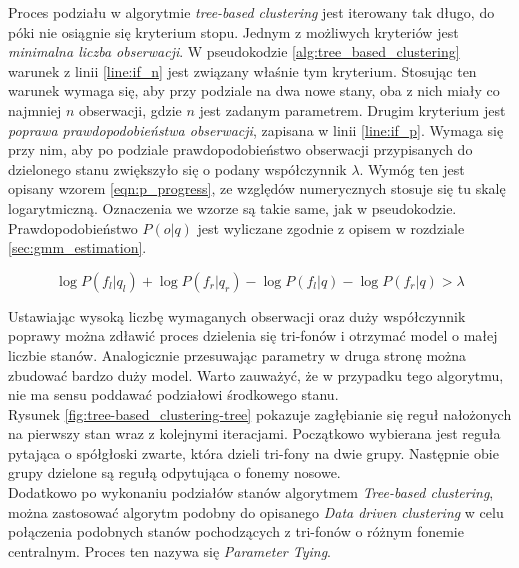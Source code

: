 \documentclass[shortabstract, mgr]{iithesis}
\begin{document}
	Proces podziału w algorytmie \textit{tree-based clustering} jest iterowany tak długo, do póki nie osiągnie się kryterium stopu. Jednym z możliwych kryteriów jest \textit{minimalna liczba obserwacji}. W pseudokodzie \ref{alg:tree_based_clustering} warunek z linii \ref{line:if_n} jest związany właśnie tym kryterium. Stosując ten warunek wymaga się, aby przy podziale na dwa nowe stany, oba z nich miały co najmniej $n$ obserwacji, gdzie $n$ jest zadanym parametrem. Drugim kryterium jest \textit{poprawa prawdopodobieństwa obserwacji}, zapisana w linii \ref{line:if_p}. Wymaga się przy nim, aby po podziale prawdopodobieństwo obserwacji przypisanych do dzielonego stanu zwiększyło się o podany współczynnik $\lambda$. Wymóg ten jest opisany wzorem \ref{eqn:p_progress}, ze względów numerycznych stosuje się tu skalę logarytmiczną. Oznaczenia we wzorze są takie same, jak w pseudokodzie. Prawdopodobieństwo $P(o|q)$ jest wyliczane zgodnie z opisem w rozdziale \ref{sec:gmm_estimation}.
	 
	 \begin{equation}
	 	\log{P(f_l | q_l)} + \log{P(f_r | q_r)} - \log{P(f_l | q)} - \log{P(f_r | q)} > \lambda
	 	\label{eqn:p_progress}
	 \end{equation}
	 
	Ustawiając wysoką liczbę wymaganych obserwacji oraz duży współczynnik poprawy można zdławić proces dzielenia się tri-fonów i otrzymać model o małej liczbie stanów. Analogicznie przesuwając parametry w druga stronę można zbudować bardzo duży model. Warto zauważyć, że w przypadku tego algorytmu, nie ma sensu poddawać podziałowi środkowego stanu.  \\
	Rysunek \ref{fig:tree-based_clustering-tree} pokazuje zagłębianie się reguł nałożonych na pierwszy stan wraz z kolejnymi iteracjami. Początkowo wybierana jest reguła pytająca o spółgłoski zwarte, która dzieli tri-fony na dwie grupy. Następnie obie grupy dzielone są regułą odpytująca o fonemy nosowe. \\
	Dodatkowo po wykonaniu podziałów stanów algorytmem \textit{Tree-based clustering}, można zastosować algorytm podobny do opisanego \textit{Data driven clustering} w celu połączenia podobnych stanów pochodzących z tri-fonów o różnym fonemie centralnym. Proces ten nazywa się \textit{Parameter Tying}.
	
\end{document}
